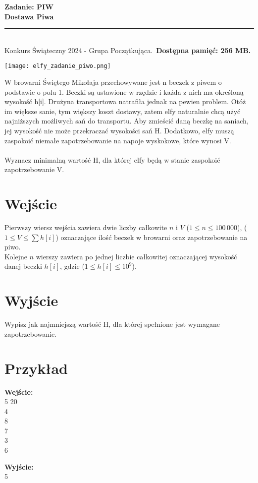 \documentclass[a4paper,11pt]{article}
\newcommand{\tasktitle}{Dostawa Piwa}
\newcommand{\taskshort}{PIW}
\newcommand{\contestinfo}{Konkurs Świąteczny 2024 - Grupa Początkująca.}
\newcommand{\memorylimit}{256 MB}
\newcommand{\exampleinput}{5 20\\4\\8\\7\\3\\6}
\newcommand{\exampleoutput}{5}
\begin{document}
\noindent\textbf{\LARGE Zadanie: \taskshort} \\
\textbf{\Large \tasktitle} \\
\rule{\textwidth}{0.4pt} \\
\small \contestinfo \
\textbf{Dostępna pamięć: \memorylimit.}

\begin{center}
\texttt{[image: elfy\_zadanie\_piwo.png]} %
\end{center}

\noindent W browarni Świętego Mikołaja przechowywane jest n beczek z piwem o podstawie o polu 1. Beczki są ustawione w rzędzie i każda z nich ma określoną wysokość h[i]. Drużyna transportowa natrafiła jednak na pewien problem. Otóż im większe sanie, tym większy koszt dostawy, zatem elfy naturalnie chcą użyć najniższych możliwych sań do transportu. Aby zmieścić daną beczkę na saniach, jej wysokość nie może przekraczać wysokości sań H. Dodatkowo, elfy muszą zaspokoić niemałe zapotrzebowanie na napoje wyskokowe, które wynosi V.\\\\Wyznacz minimalną wartość H, dla której elfy będą w stanie zaspokoić zapotrzebowanie V.


\section*{Wejście}
Pierwszy wiersz wejścia zawiera dwie liczby całkowite $n$ i $V$ ($1 \leq n \leq 100\,000$), ($1 \leq V \leq \sum h[i]$) oznaczające ilość beczek w browarni oraz zapotrzebowanie na piwo.\\Kolejne $n$ wierszy zawiera po jednej liczbie całkowitej oznaczającej wysokość danej beczki $h[i]$, gdzie ($1 \leq h[i] \leq 10^9$).

\section*{Wyjście}
Wypisz jak najmniejszą wartość H, dla której spełnione jest wymagane zapotrzebowanie.
\newpage
\section*{Przykład}
\begin{multicols}{2}
\noindent\textbf{Wejście:} \\
\exampleinput

\columnbreak

\noindent\textbf{Wyjście:} \\
\exampleoutput
\end{multicols}
\end{document}
